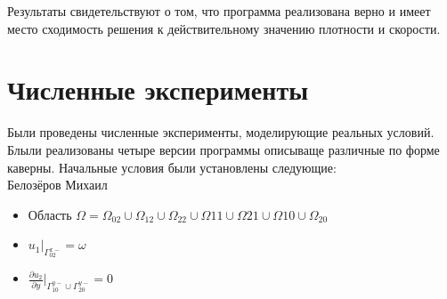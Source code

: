 \documentclass[a4paper, 25pt]{article}
\begin{document}
Результаты свидетельствуют о том, что программа реализована верно и имеет место сходимость решения к действительному значению плотности и скорости.
\newpage

\section {Численные эксперименты}

Были проведены численные эксперименты, моделирующие реальных условий.
Блыли реализованы четыре версии программы описываще различные по форме каверны.
Начальные условия были установлены следующие:\\
Белозёров Михаил
\begin {itemize}
\item Область $\Omega = \Omega_{02} \cup \Omega_{12} \cup \Omega_{22} \cup \Omega{11} \cup \Omega{21} \cup \Omega{10} \cup \Omega_{20}$
  \item $u_1|_{\Gamma_{02}^{x-}} = \omega$
  \item $\frac{{\partial}u_2}{{\partial}y}|_{\Gamma_{10}^{y-}\cup\Gamma_{20}^{y-}} = 0$
\end   {itemize}
\end{document}
